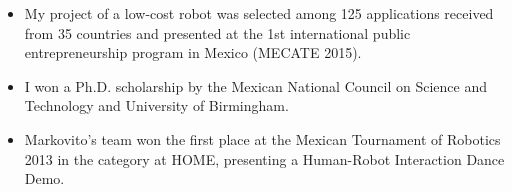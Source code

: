 \documentclass{mycv}
\begin{document}
\begin{itemize}
\item My project of a low-cost robot was selected among 125 applications received from 35 countries and presented at the 1st international public entrepreneurship program in Mexico (MECATE 2015). \href{http://let-emprendimientopublico.mx/en/portfolio_category/mecate-primera-generacion-en/}{\faExternalLink*} \href{https://www.youtube.com/watch?v=VjVGnwD422g}{\faYoutube} 

\item I won a Ph.D. scholarship by the Mexican National Council on Science and Technology and University of Birmingham. 

\item Markovito's team won the first place at the Mexican Tournament of Robotics 2013 in the category at HOME, presenting a Human-Robot Interaction Dance Demo. \href{https://www.youtube.com/watch?v=Kw-lZam_qZI}{\faYoutube} 

\end{itemize}

\end{document}
